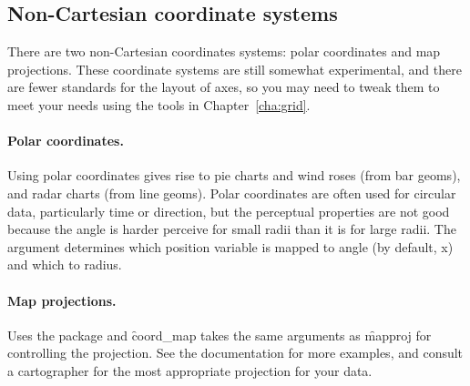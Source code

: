 \subsection{Non-Cartesian coordinate systems}

There are two non-Cartesian coordinates systems: polar coordinates and map projections.  These coordinate systems are still somewhat experimental, and there are fewer standards for the layout of axes, so you may need to tweak them to meet your needs using the tools in Chapter~\ref{cha:grid}.

\paragraph{Polar coordinates.}  Using polar coordinates gives rise to pie charts and wind roses (from bar geoms), and radar charts (from line geoms).  Polar coordinates are often used for circular data, particularly time or direction, but the perceptual properties are not good because the angle is harder perceive for small radii than it is for large radii.  The  argument determines which position variable is mapped to angle (by default, x) and which to radius.  

\paragraph{Map projections.}  Uses the  package \citep{mapproj} and \f{coord_map} takes the same arguments as \f{mapproj} for controlling the projection.  See the documentation for more examples, and consult a cartographer for the most appropriate projection for your data.


